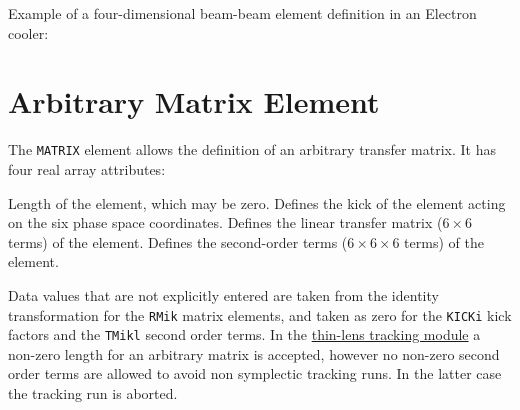 Example of a four-dimensional beam-beam element definition in an
Electron cooler:


\section{Arbitrary Matrix Element}


The \texttt{MATRIX} element allows the definition of an arbitrary transfer matrix.
It has four real array attributes:
\begin{madlist}
    Length of the element, which may be zero.
    Defines the kick of the element acting on the six phase
     space coordinates.
    Defines the linear transfer matrix ($6\times6$ terms) of the element.
    Defines the second-order terms ($6\times6\times6$ terms) of the element.
\end{madlist}

Data values that are not explicitly entered are taken from the identity
transformation for the \texttt{RMik} matrix elements, and taken as zero
for the \texttt{KICKi} kick factors and the \texttt{TMikl} second order
terms.
In the \hyperref[chap:thintrack]{thin-lens tracking
module} a non-zero length for an arbitrary matrix is accepted, however
no non-zero second order terms are allowed to avoid non symplectic
tracking runs. In the latter case the tracking run is aborted.


